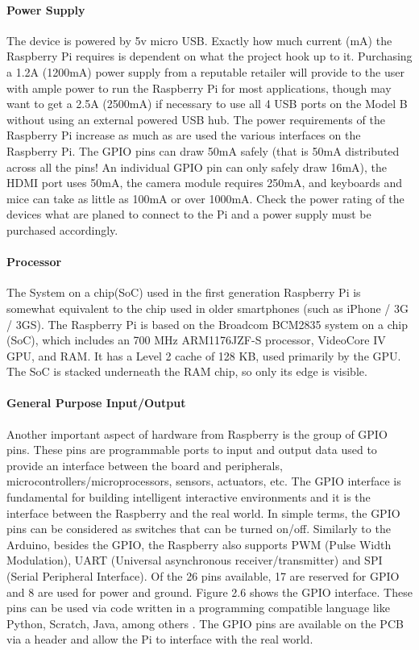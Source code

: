 \documentclass{acm_proc_article-sp}
\begin{document}
\paragraph{Power Supply}
The device is powered by 5v micro USB. Exactly how much current (mA) the Raspberry Pi requires is dependent on what the project hook up to it. Purchasing a 1.2A (1200mA) power supply from a reputable retailer will provide to the user with ample power to run the Raspberry Pi for most applications, though may want to get a 2.5A (2500mA) if necessary to use all 4 USB ports on the Model B without using an external powered USB hub.
\newline
\newline
The power requirements of the Raspberry Pi increase as much as are used the various interfaces on the Raspberry Pi. The GPIO pins can draw 50mA safely (that is 50mA distributed across all the pins! An individual GPIO pin can only safely draw 16mA), the HDMI port uses 50mA, the camera module requires 250mA, and keyboards and mice can take as little as 100mA or over 1000mA. Check the power rating of the devices  what are planed to connect to the Pi and a power supply must be purchased accordingly.

\paragraph{Processor}
The System on a chip(SoC) used in the first generation Raspberry Pi is somewhat equivalent to the chip used in older smartphones (such as iPhone / 3G / 3GS). The Raspberry Pi is based on the Broadcom BCM2835 system on a chip (SoC)\cite{Broadcom}, which includes an 700 MHz ARM1176JZF-S processor, VideoCore IV GPU\cite{Brose}, and RAM. It has a Level 2 cache of 128 KB, used primarily by the GPU. The SoC is stacked underneath the RAM chip, so only its edge is visible.

\paragraph{General Purpose Input/Output}
Another important aspect of hardware from Raspberry is the group of GPIO pins. These pins are programmable ports to input and output data used to provide an interface between the board and peripherals, microcontrollers/microprocessors, sensors, actuators, etc. The GPIO interface is fundamental for building intelligent interactive environments and it is the interface between the Raspberry and the real world. In simple terms, the GPIO pins can be considered as switches that can be turned on/off.
\newline
\newline
Similarly to the Arduino, besides the GPIO, the Raspberry also supports PWM (Pulse Width Modulation), UART (Universal asynchronous receiver/transmitter) and SPI (Serial Peripheral Interface). Of the 26 pins available, 17 are reserved for GPIO and 8 are used for power and ground. Figure 2.6 shows the GPIO interface. These pins can be used via code written in a programming compatible language like Python, Scratch, Java, among others \cite{Brose}.
The GPIO pins are available on the PCB via a header and allow the Pi to interface with the real world.
\end{document}
